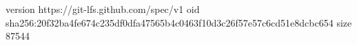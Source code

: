 version https://git-lfs.github.com/spec/v1
oid sha256:20f32ba4fe674c235df0dfa47565b4c0463f10d3c26f57e57c6cd51e8dcbc654
size 87544
